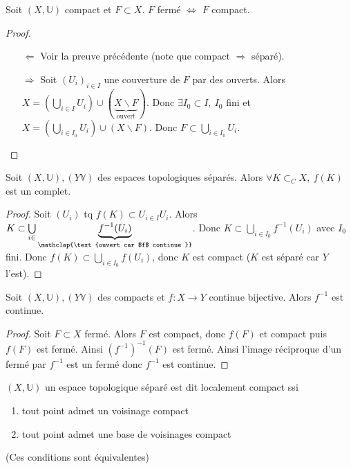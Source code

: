 \begin{corollaire}
    Soit $(X,\mathbb{U})$ compact et $F\subset X$. $F$ fermé $\Leftrightarrow $ $F$ compact.
\end{corollaire}
\begin{proof}
    \begin{itemize}
        \item[$\Leftarrow$] Voir la preuve précédente (note que compact $\Rightarrow $ séparé).
        \item[$\Rightarrow $] Soit $(U_i)_{i\in I}$ une couverture de $F$ par des ouverts. Alors $X=\left( \bigcup\limits_{i \in  I} U_i \right) \cup \left( \underbrace{X\backslash F}_{\text{ouvert}} \right) $. Donc $\exists I_0\subset I,\ I_0$ fini et $X=\left( \bigcup\limits_{i \in  I_0} U_i \right) \cup \left(X\backslash F \right)$. Donc $F\subset \bigcup\limits_{i\in I_0} U_i.$
    \end{itemize}
\end{proof}
\begin{lemme}
    Soit $(X,\mathbb{U}),(Y\mathbb{V})$ des espaces topologiques séparés. Alors $\forall K\subset _CX,\ f(K) $ est un complet.
\end{lemme}
\begin{proof}
    Soit $(U_i)$ tq $f(K)\subset U_{i\in I}U_i$. Alors $K\subset \bigcup\limits_{i \in} \underbrace{f^{-1} (U_i)}_{ \mathclap{\text{ouvert car $f$ continue }}}$. Donc $K\subset \bigcup\limits_{i\in I_0} f^{-1} (U_i)$ avec $I_0$ fini. Donc $f(K)\subset \bigcup\limits_{i\in I_0} f(U_i)$, donc $K$ est compact ($K$ est séparé car $Y$ l'est).
\end{proof}
\begin{corollaire}
    Soit $(X,\mathbb{U}),(Y\mathbb{V})$ des compacts et $f:X\to Y$ continue bijective. Alors $f^{-1} $ est continue.
\end{corollaire}
\begin{proof}
    Soit $F\subset X$ fermé. Alors $F$ est compact, donc $f(F)$ et compact puis $f(F)$ est fermé. Ainsi $\left( f^{-1}  \right) ^{-1} (F)$ est fermé. Ainsi l'image réciproque d'un fermé par $f^{-1} $ est un fermé donc $f^{-1} $ est continue.
\end{proof}
\begin{definition}
    $(X,\mathbb{U})$ un espace topologique séparé est dit localement compact ssi
   \begin{enumerate}
       \item tout point admet un voisinage compact
        \item tout point admet une base de voisinages compact
   \end{enumerate}
   (Ces conditions sont équivalentes)
\end{definition}
